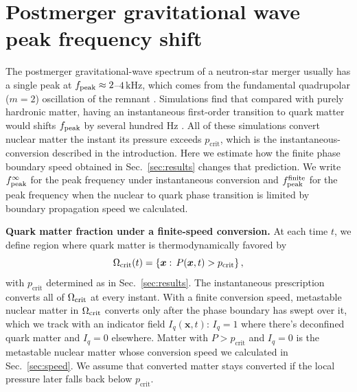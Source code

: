 \documentclass[10pt,superscriptaddress,amsmath,aps,prc,twocolumn,nofootinbib,floatfix]{revtex4-1}
\newcommand{\kHz}{\text{kHz}}
\begin{document}
\section{Postmerger gravitational wave peak frequency shift}
\label{sec:gw}

The postmerger gravitational-wave spectrum of a neutron-star merger usually has a single peak at $f_{\rm peak}\approx2$--$4\,\kHz$, which comes from the fundamental quadrupolar ($m=2$) oscillation of the remnant \cite{Stergioulas:2011gd,Takami:2014tva}.
Simulations find that compared with purely hardronic matter, having an instantaneous first-order transition to quark matter would shifts $f_{\rm peak}$ by several hundred Hz \cite{Bauswein:2018bma,Most:2018eaw,Weih:2019xvw,Bauswein:2020ggy,Fujimoto:2022xhv,Espino:2023llj}.
All of these simulations convert nuclear matter the instant its pressure exceeds $p_\text{crit}$, which is the instantaneous-conversion described in the introduction.
Here we estimate how the finite phase boundary speed obtained in Sec.~\ref{sec:results} changes that prediction.
We write $f_{\rm peak}^{\infty}$ for the peak frequency under instantaneous conversion and $f_{\rm peak}^{\rm finite}$ for the peak frequency when the nuclear to quark phase transition is limited by boundary propagation speed we calculated.

\textbf{Quark matter fraction under a finite-speed conversion.}
At each time $t$, we define region where quark matter is thermodynamically favored by
\begin{equation}
\Omega_{\rm crit}(t)
=\left\{\boldsymbol{x}:\,P(\boldsymbol{x},t)>p_\text{crit}\right\},
\label{eq:critical_region}
\end{equation}
with $p_\text{crit}$ determined as in Sec.~\ref{sec:results}.
The instantaneous prescription converts all of $\Omega_{\rm crit}$ at every instant.
With a finite conversion speed, metastable nuclear matter in $\Omega_{\rm crit}$ converts only after the phase boundary has swept over it, which we track with an indicator field $I_q(\boldsymbol{x},t)$: $I_q=1$ where there's deconfined quark matter and $I_q=0$ elsewhere.
Matter with $P>p_\text{crit}$ and $I_q=0$ is the metastable nuclear matter whose conversion speed we calculated in Sec.~\ref{sec:speed}.
We assume that converted matter stays converted if the local pressure later falls back below $p_\text{crit}$.

\end{document}
